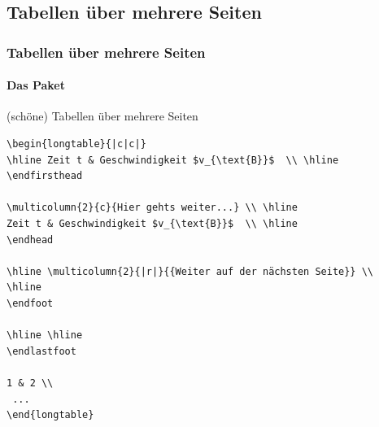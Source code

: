 \subsection{Tabellen über mehrere Seiten}

\begin{frame}[fragile]
\frametitle{Tabellen über mehrere Seiten}
\framesubtitle{Das Paket }
(schöne) Tabellen über mehrere Seiten

\footnotesize
\begin{codeblock}
\begin{Verbatim}[fontsize=\tiny]  
\begin{longtable}{|c|c|}
\hline Zeit t & Geschwindigkeit $v_{\text{B}}$  \\ \hline 
\endfirsthead

\multicolumn{2}{c}{Hier gehts weiter...} \\ \hline 
Zeit t & Geschwindigkeit $v_{\text{B}}$  \\ \hline 
\endhead

\hline \multicolumn{2}{|r|}{{Weiter auf der nächsten Seite}} \\ 
\hline
\endfoot

\hline \hline
\endlastfoot

1 & 2 \\ 
 ...
\end{longtable}
\end{Verbatim}
\end{codeblock}
\end{frame}

